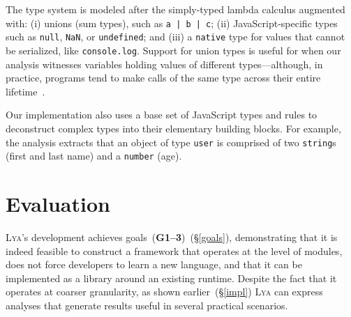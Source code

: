 \documentclass[letterpaper,twocolumn,10pt]{article}
\newcommand{\ttt}[1]{\texttt{#1}}
\newcommand{\sx}[1]{(\S\ref{#1})}
\newcommand{\sys}{{\scshape Lya}\xspace}
\newcommand{\goal}[1]{(\textbf{G#1})\xspace}
\begin{document}
The type system is modeled after the simply-typed lambda calculus augmented with:
  (i) unions (sum types), such as \ttt{a | b | c}; 
  (ii) JavaScript-specific types such as \ttt{null}, \ttt{NaN}, or \ttt{undefined}; and
  (iii) a \ttt{native} type for values that cannot be serialized, like \ttt{console.log}.
Support for union types is useful for when our analysis witnesses variables holding values of different types---although, in practice,  programs tend to make calls of the same type across their entire lifetime~\cite{daikon}.

Our implementation also uses a base set of JavaScript types and rules to deconstruct complex types into their elementary building blocks.
For example, the analysis extracts that an object of type \ttt{user} is comprised of two \ttt{string}s (first and last name) and a \ttt{number} (age).


% 

\section{Evaluation}
\label{eval}

\sys's  development achieves goals~\goal{1--3}~\sx{goals}, demonstrating that it is indeed feasible to construct a framework that operates at the level of modules, 
does not force developers to learn a new language, and that it can be implemented as a library around an existing runtime.
Despite the fact that it operates at coarser granularity, as shown earlier~\sx{impl} \sys can express analyses that generate results useful in several practical scenarios.
\end{document}
